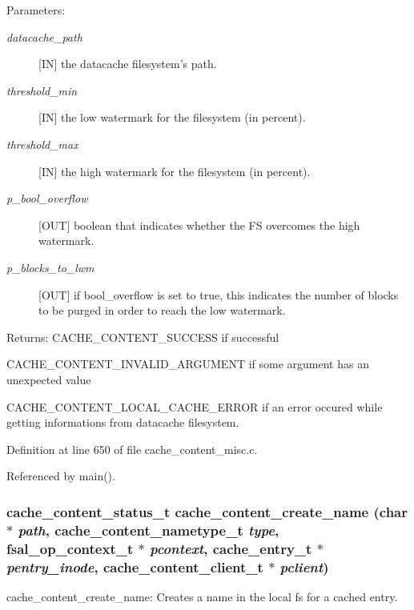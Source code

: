 \begin{Desc}
\item[Parameters:]
\begin{description}
\item[{\em datacache\_\-path}][IN] the datacache filesystem's path. \item[{\em threshold\_\-min}][IN] the low watermark for the filesystem (in percent). \item[{\em threshold\_\-max}][IN] the high watermark for the filesystem (in percent). \item[{\em p\_\-bool\_\-overflow}][OUT] boolean that indicates whether the FS overcomes the high watermark. \item[{\em p\_\-blocks\_\-to\_\-lwm}][OUT] if bool\_\-overflow is set to true, this indicates the number of blocks to be purged in order to reach the low watermark.\end{description}
\end{Desc}
\begin{Desc}
\item[Returns:]CACHE\_\-CONTENT\_\-SUCCESS if successful \par
 

CACHE\_\-CONTENT\_\-INVALID\_\-ARGUMENT if some argument has an unexpected value\par
 

CACHE\_\-CONTENT\_\-LOCAL\_\-CACHE\_\-ERROR if an error occured while getting informations from datacache filesystem. \end{Desc}


Definition at line 650 of file cache\_\-content\_\-misc.c.

Referenced by main().
\subsubsection{\setlength{\rightskip}{0pt plus 5cm}cache\_\-content\_\-status\_\-t cache\_\-content\_\-create\_\-name (char $\ast$ {\em path}, cache\_\-content\_\-nametype\_\-t {\em type}, fsal\_\-op\_\-context\_\-t $\ast$ {\em pcontext}, cache\_\-entry\_\-t $\ast$ {\em pentry\_\-inode}, cache\_\-content\_\-client\_\-t $\ast$ {\em pclient})}\label{cache__content__misc_8c_a4}


cache\_\-content\_\-create\_\-name: Creates a name in the local fs for a cached entry.

